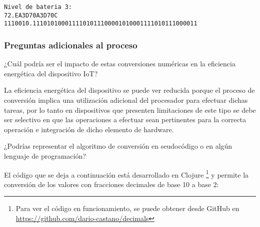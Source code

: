 \documentclass[stu, 12pt, letterpaper, donotrepeattitle, floatsintext, natbib]{apa7}
\begin{document}
\begin{verbatim}
Nivel de bateria 3: 
72.EA3D70A3D70C
1110010.1110101000111101011100001010001111010111000011
\end{verbatim}


\subsubsection{Preguntas adicionales al proceso}
¿Cuál podría ser el impacto de estas conversiones numéricas en la eficiencia energética del dispositivo IoT?

La eficiencia energética del dispositivo se puede ver reducida porque el proceso de conversión implica una utilización adicional del procesador para efectuar dichas tareas, por lo tanto en dispositivos que presenten limitaciones de este tipo se debe ser selectivo en que las operaciones a efectuar sean pertinentes para la correcta operación e integración de dicho elemento de hardware.

¿Podrías representar el algoritmo de conversión en seudocódigo o en algún lenguaje de programación?

El código que se deja a continuación está desarrollado en Clojure \footnote{Para ver el código en funcionamiento, se puede obtener desde GitHub en \url{https://github.com/dario-castano/decimals}} y permite la conversión de los valores con fracciones decimales de base 10 a base 2:
\end{document}
